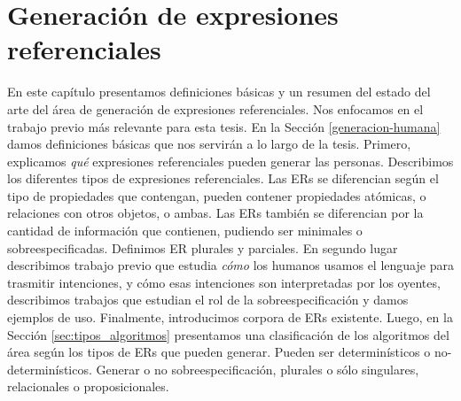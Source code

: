 \chapter{Generaci\'on de expresiones referenciales}
\label{sec:seleccion}

En este cap\'itulo presentamos definiciones b\'asicas y un resumen del estado del arte del \'area de generaci\'on de expresiones referenciales. Nos enfocamos en el trabajo previo m\'as relevante para esta tesis. 
En la Secci\'on \ref{generacion-humana} damos definiciones b\'asicas que nos servir\'an a 
lo largo de la tesis. Primero, explicamos \emph{qu\'e} expresiones referenciales pueden generar las personas. Describimos los diferentes tipos de expresiones referenciales. Las ERs se diferencian seg\'un el tipo de propiedades que 
contengan, pueden contener propiedades at\'omicas, o relaciones con otros objetos, o ambas. Las ERs tambi\'en se diferencian por la cantidad de informaci\'on que contienen, pudiendo ser minimales o sobreespecificadas. Definimos ER plurales y parciales. %
En segundo lugar describimos trabajo previo que estudia \emph{c\'omo} los humanos usamos el lenguaje para trasmitir intenciones, y c\'omo esas intenciones son interpretadas por los oyentes, describimos trabajos que estudian el rol de la sobreespecificaci\'on y damos ejemplos de uso. Finalmente, introducimos corpora de ERs existente. Luego, en la Secci\'on \ref{sec:tipos_algoritmos} presentamos una clasificaci\'on de los algoritmos del \'area seg\'un los tipos de ERs que pueden generar. Pueden ser determin\'isticos o no-determin\'isticos. Generar o no sobreespecificaci\'on, plurales o s\'olo singulares, relacionales o proposicionales.
